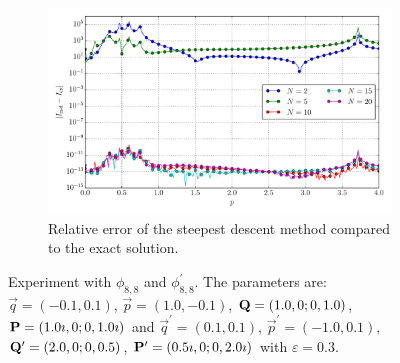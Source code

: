 \documentclass[a4paper,10pt]{article}
\begin{document}
\begin{figure}[ht!]
\begin{subfigure}[t]{0.5\linewidth}
    \includegraphics[width=\linewidth]{./plots/tp_2d_conv_p_(8,8)_(8,8)_err_rel_nsd.pdf}
    \caption{Relative error of the steepest descent method compared to the exact solution.}
    \label{fig:tp_2d_conv_p_88_88_err_rel_nsd}
  \end{subfigure}
  \label{fig:tp_2d_conv_p_88_88}
  \caption{Experiment with $\phi_{8,8}$ and $\phi_{8,8}^{\prime}$.
  The parameters are:
  $\vec{q} = (-0.1,  0.1)$,
  $\vec{p} = ( 1.0, -0.1)$,
  $\mathbf{Q} = ( 1.0,       0; 0, 1.0)$,
  $\mathbf{P} = ( 1.0\imath, 0; 0, 1.0\imath)$
  and
  $\vec{q}^\prime = ( 0.1, 0.1)$,
  $\vec{p}^\prime = (-1.0, 0.1)$,
  $\mathbf{Q}^\prime = ( 2.0,       0; 0, 0.5)$,
  $\mathbf{P}^\prime = ( 0.5\imath, 0; 0, 2.0\imath)$
  with $\varepsilon=0.3$.}
\end{figure}
\end{document}
